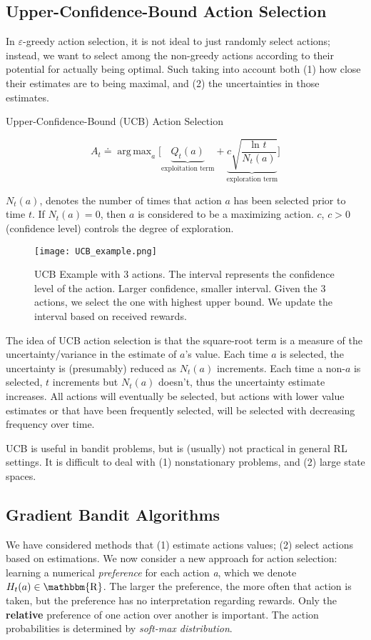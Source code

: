 \documentclass[lang=en,mode=geye,device=normal,color=blue,14pt]{elegantnote}
\DeclareMathOperator*{\1}{\mathbbm{1}}
\DeclareMathOperator*{\R}{\mathbbm{R}}
\DeclareMathOperator*{\argmax}{arg\,max}
\begin{document}
\subsection{Upper-Confidence-Bound Action Selection}

In $\varepsilon$-greedy action selection, it is not ideal to just randomly select actions; instead, we want to select among the non-greedy actions according to their potential for actually being optimal. Such taking into account both (1) how close their estimates are to being maximal, and (2) the uncertainties in those estimates.

\begin{definition}
Upper-Confidence-Bound (UCB) Action Selection

\[
A_t \doteq \argmax_a \bigg[ \underbrace{Q_t(a)}_{\text{exploitation term}} + \underbrace{c\sqrt{\frac{\text{ln }t}{N_t(a)}}}_{\text{exploration term}} \bigg]
\]
\end{definition}
$N_t(a)$, denotes the number of times that action $a$ has been selected prior to time $t$. If $N_t(a)=0$, then $a$ is considered to be a maximizing action.
$c$, $c > 0$ (confidence level) controls the degree of exploration.

\begin{figure}[!h]
  \centering
  \texttt{[image: UCB\_example.png]}
  \caption{UCB Example with 3 actions. The interval represents the confidence level of the action. Larger confidence, smaller interval. Given the 3 actions, we select the one with highest upper bound. We update the interval based on received rewards.}
  \label{fig:UCB_example}
\end{figure}

The idea of UCB action selection is that the square-root term is a measure of the uncertainty/variance in the estimate of $a$'s value.
Each time $a$ is selected, the uncertainty is (presumably) reduced as $N_t(a)$ increments.
Each time a non-$a$ is selected, $t$ increments but $N_t(a)$ doesn't, thus the uncertainty estimate increases.
All actions will eventually be selected, but actions with lower value estimates or that have been frequently selected, will be selected with decreasing frequency over time.

UCB is useful in bandit problems, but is (usually) not practical in general RL settings. It is difficult to deal with (1) nonstationary problems, and (2) large state spaces.

\subsection{Gradient Bandit Algorithms}
We have considered methods that (1) estimate actions values; (2) select actions based on estimations.
We now consider a new approach for action selection: learning a numerical \textit{preference} for each action \textit{a}, which we denote $H_t(a) \in \R$.
The larger the preference, the more often that action is taken, but the preference has no interpretation regarding rewards.
Only the \textbf{relative} preference of one action over another is important.
The action probabilities is determined by \textit{soft-max distribution}.
\end{document}
